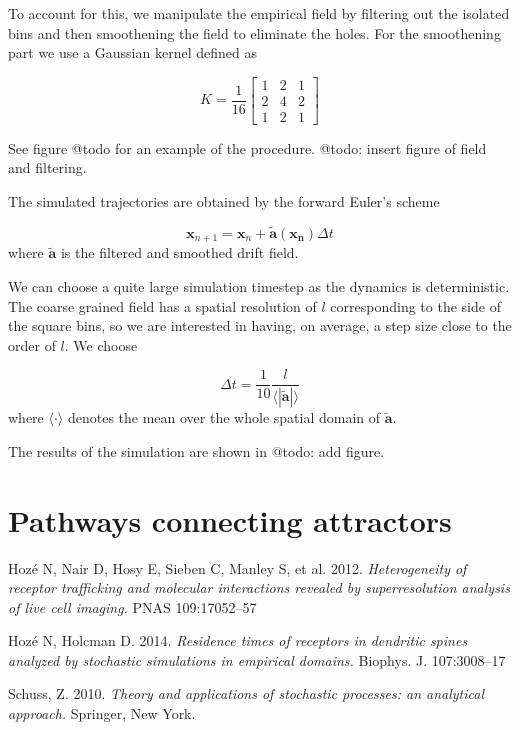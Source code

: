 \documentclass[a4paper]{article}
\begin{document}
To account for this, we manipulate the empirical field by filtering out the isolated bins and then smoothening the field to eliminate the holes. For the smoothening part we use a Gaussian kernel defined as

\begin{equation}
K = \frac{1}{16} \begin{bmatrix} 1 & 2 & 1 \\ 2 & 4 & 2 \\ 1 & 2 & 1\end{bmatrix}
\end{equation}

See figure @todo for an example of the procedure.
@todo: insert figure of field and filtering.

The simulated trajectories are obtained by the forward Euler's scheme

\begin{equation}
\bm{x}_{n+1} = \bm{x}_n + \bm{\tilde{a}}(\bm{x_n})\Delta t
\end{equation}
where $\bm{\tilde{a}}$ is the filtered and smoothed drift field.

We can choose a quite large simulation timestep as the dynamics is deterministic. The coarse grained field has a spatial resolution of $l$ corresponding to the side of the square bins, so we are interested in having, on average, a step size close to the order of $l$. We choose

\begin{equation}
\Delta t = \frac{1}{10} \frac{l}{\langle|\bm{\tilde{a}}|\rangle}
\end{equation}
where $\langle\cdot\rangle$ denotes the mean over the whole spatial domain of $\bm{\tilde{a}}$.

The results of the simulation are shown in @todo: add figure.
\section{Pathways connecting attractors}




\begin{thebibliography}{9}
Hoz\'e N, Nair D, Hosy E, Sieben C, Manley S, et al. 2012. \textit{Heterogeneity of receptor trafficking and molecular interactions revealed by superresolution analysis of live cell imaging.} PNAS 109:17052–57

Hoz\'e N, Holcman D. 2014. \textit{Residence times of receptors in dendritic spines analyzed by stochastic simulations in empirical domains.} Biophys. J. 107:3008–17

Schuss, Z. 2010. \textit{Theory and applications of stochastic processes: an analytical approach.} Springer, New York.

\end{thebibliography}
\end{document}
